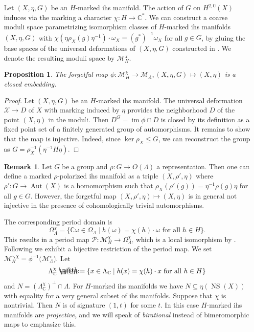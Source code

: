 \documentclass{amsart}
\makeatletter
\theoremstyle{definition}
\newtheorem{remark}[definition]{Remark}
\theoremstyle{plain}
\newtheorem{proposition}[definition]{Proposition}
\DeclareMathOperator{\NS}{NS}
\DeclareMathOperator{\Aut}{Aut}
\DeclareMathOperator{\im}{im}
\newcommand{\CC}{\mathbb{C}}
\newcommand{\X}{\mathcal{X}}
\newcommand{\M}{\mathcal{M}}
\renewcommand{\P}{\mathcal{P}}
\newcommand*{\defeq}{\mathrel{\rlap{%
                     \raisebox{0.3ex}{$\m@th\cdot$}}%
                     \raisebox{-0.3ex}{$\m@th\cdot$}}%
                     =}
\makeatother
\begin{document}
 Let $(X,\eta,G)$ be an $H$-marked ihs manifold.
 The action of $G$ on $H^{2,0}(X)$ induces via the marking a character $\chi \colon H \rightarrow \CC^*$.
 We can construct a coarse moduli space parametrizing isomorphism classes of $H$-marked ihs manifolds $(X,\eta,G)$ with
 $\chi(\eta\rho_X(g)\eta^{-1}) \cdot \omega_X = (g^*)^{-1} \omega_X$ for all $g \in G$, by gluing the base spaces of the universal deformations of $(X,\eta,G)$ constructed in .
 We denote the resulting moduli space by $\mathcal{M}^\chi_H$.

 \begin{proposition}\label{prop:forgetful}
 The forgetful map $\phi \colon \mathcal{M}^\chi_H \rightarrow \mathcal{M}_\Lambda, (X,\eta,G) \mapsto (X,\eta)$
 is a closed embedding.
 \end{proposition}
 \begin{proof}
 Let $(X,\eta,G)$ be an $H$-marked ihs manifold.
 The universal deformation $\X \rightarrow D$ of $X$ with marking induced by $\eta$ provides the neighborhood $D$ of the point $(X,\eta)$ in the moduli. Then $D^G= \im \phi \cap D$ is closed by its definition as a fixed point set of a finitely generated group of automorphisms.
 It remains to show that the map is injective.
 Indeed, since $\ker \rho_X \leq G$, we can reconstruct the group as $G = \rho_X^{-1}(\eta^{-1} H \eta)$.
 \end{proof}

 \begin{remark}
 Let $G$ be a group and $\rho \colon G \rightarrow O(\Lambda)$ a representation. Then one can define a marked $\rho$-polarized ihs manifold as a triple $(X,\rho',\eta)$ where $\rho'\colon G \rightarrow \Aut(X)$ is a homomorphism such that
 $\rho_X(\rho'(g)) = \eta^{-1} \rho(g) \eta$ for all $g \in G$.
 However, the forgetful map $(X,\rho',\eta)\mapsto (X,\eta)$ is in general not  injective in the presence of cohomologically trivial automorphisms.
 \end{remark}
The corresponding period domain is
\[\Omega_\Lambda^\chi=\{\CC \omega \in \Omega_\Lambda \mid h(\omega)=\chi(h)\cdot \omega \mbox{ for all } h \in H\}.\]
This results in a period map
$\P\colon \M^\chi_H \rightarrow \Omega_\Lambda^\chi$, which is a
local isomorphism by .
Following \cite{joumaa:order2, bcs:ball} we exhibit
a bijective restriction of the period map.
We set $\mathcal{M}_H^{\circ,\chi} = \phi^{-1}(\mathcal{M}_\Lambda^\circ$).
Let
\[ \Lambda^\chi_\CC \defeq \{x \in \Lambda_\CC \mid h(x)=\chi(h)\cdot x \mbox{ for all } h \in H\}\]
and $N = (\Lambda_\CC^\chi)^\perp \cap \Lambda$.
For $H$-marked ihs manifolds we have
$N\subseteq \eta(\NS(X))$ with equality for a
very general subset of ihs manifolds.
Suppose that $\chi$ is nontrivial.
Then $N$ is of signature
$(1,t)$ for some $t$. In this case $H$-marked ihs manifolds are \emph{projective}, and we will speak of \emph{birational} instead of bimeromorphic maps to emphasize this. 
\end{document}
